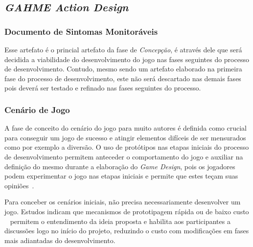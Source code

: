 \subsection{\textit{GAHME Action Design}}\label{subsec:game_actions_guide}
\subsubsection{Documento de Sintomas Monitoráveis}
Esse artefato é o princial artefato da fase de \textit{Concepção}, é através dele que será decidida a viabilidade do desenvolvimento do jogo nas fases seguintes do processo de desenvolvimento. Contudo, mesmo sendo um artefato elaborado na primeira fase do processo de desenvolvimento, este não será descartado nas demais fases pois deverá ser testado e refinado nas fases seguintes do processo.


\subsubsection{Cenário de Jogo}
A fase de conceito do cenário do jogo para muito autores é definida como crucial para conseguir um jogo de sucesso e atingir elementos difíceis de ser mensurados como por exemplo a diversão. O uso de protótipos nas etapas iniciais do processo de desenvolvimento permitem anteceder o comportamento do jogo e auxiliar na definição do mesmo durante a elaboração do \textit{Game Design}, pois os jogadores podem experimentar o jogo nas etapas iniciais e permite que estes teçam suas opiniões~\cite{prototipgames2007}.
 
Para conceber os cenários iniciais, não precisa necessariamente desenvolver um jogo. Estudos indicam que mecanismos de prototipagem rápida ou de baixo custo ~\cite{prototipgames2007,fullerton2008game} permitem o entendimento da ideia proposta e habilita aos participantes a discussões logo no início do projeto, reduzindo o custo com modificações em fases mais adiantadas do desenvolvimento. 





